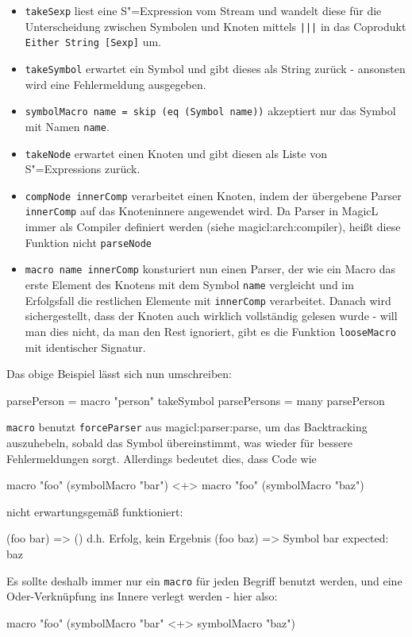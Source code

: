 \documentclass[a4paper, bibgerm]{book}
\newcommand\icode[1]{\lstinline?#1?}
\newcommand\sref{}
\newcommand{\sexp}{S"=Expression}
\newcommand{\sexps}{S"=Expressions}
\begin{document}
\begin{itemize}
\item \icode{takeSexp} liest eine \sexp{} vom Stream und wandelt diese
  für die Unterscheidung zwischen Symbolen und Knoten mittels
  \icode{|||} in das Coprodukt \icode{Either String [Sexp]} um.
\item \icode{takeSymbol} erwartet ein Symbol und gibt dieses als String
  zurück - ansonsten wird eine Fehlermeldung ausgegeben.
\item \icode{symbolMacro name = skip (eq (Symbol name))} akzeptiert nur
  das Symbol mit Namen \icode{name}.
\item \icode{takeNode} erwartet einen Knoten und gibt diesen als Liste
  von \sexps{} zurück.
\item \icode{compNode innerComp} verarbeitet einen Knoten, indem der
  übergebene Parser \icode{innerComp} auf das Knoteninnere angewendet
  wird. Da Parser in MagicL immer als Compiler definiert werden (siehe
  \sref{magicl:arch:compiler}), heißt diese Funktion nicht \icode{parseNode}
\item \icode{macro name innerComp} %
  konsturiert nun einen Parser, der wie ein Macro das erste Element des
  Knotens mit dem Symbol \icode{name} vergleicht und im Erfolgsfall die
  restlichen Elemente mit \icode{innerComp} verarbeitet. Danach wird
  sichergestellt, dass der Knoten auch wirklich vollständig gelesen
  wurde - will man dies nicht, da man den Rest ignoriert, gibt es die
  Funktion \icode{looseMacro} mit identischer Signatur.
\end{itemize} 
Das obige Beispiel lässt sich nun umschreiben:
\begin{code}
parsePerson  = macro "person" takeSymbol  
parsePersons = many parsePerson
\end{code}

\icode{macro} benutzt \icode{forceParser} aus
\sref{magicl:parser:parse}, um das Backtracking auszuhebeln, sobald das
Symbol übereinstimmt, was wieder für bessere Fehlermeldungen
sorgt. Allerdings bedeutet dies, dass Code wie
\begin{code}
macro "foo" (symbolMacro "bar") <+> macro "foo" (symbolMacro "baz")
\end{code}
nicht erwartungsgemäß funktioniert:
\begin{code}
(foo bar)   => ()  d.h. Erfolg, kein Ergebnis
(foo baz)   => Symbol bar expected: baz
\end{code}
Es sollte deshalb immer nur ein \icode{macro} für jeden Begriff benutzt
werden, und eine Oder-Verknüpfung ins Innere verlegt werden - hier also:
\begin{code}
macro "foo" (symbolMacro "bar" <+> symbolMacro "baz")
\end{code}
\end{document}
